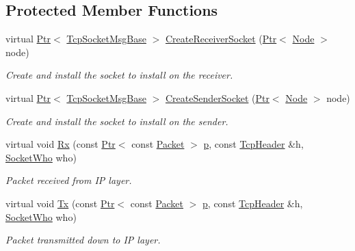 \subsection*{Protected Member Functions}
\begin{DoxyCompactItemize}
\item 
virtual \hyperlink{classns3_1_1Ptr}{Ptr}$<$ \hyperlink{classns3_1_1TcpSocketMsgBase}{Tcp\+Socket\+Msg\+Base} $>$ \hyperlink{classTcpRttEstimationTest_ad28cb87b3ee874008937ff5158980e3d}{Create\+Receiver\+Socket} (\hyperlink{classns3_1_1Ptr}{Ptr}$<$ \hyperlink{classns3_1_1Node}{Node} $>$ node)
\begin{DoxyCompactList}\small\item\em Create and install the socket to install on the receiver. \end{DoxyCompactList}\item 
virtual \hyperlink{classns3_1_1Ptr}{Ptr}$<$ \hyperlink{classns3_1_1TcpSocketMsgBase}{Tcp\+Socket\+Msg\+Base} $>$ \hyperlink{classTcpRttEstimationTest_a9b84db1757b8702294bc1310160adc44}{Create\+Sender\+Socket} (\hyperlink{classns3_1_1Ptr}{Ptr}$<$ \hyperlink{classns3_1_1Node}{Node} $>$ node)
\begin{DoxyCompactList}\small\item\em Create and install the socket to install on the sender. \end{DoxyCompactList}\item 
virtual void \hyperlink{classTcpRttEstimationTest_ae9ca082b1475694ea29c540497bd7846}{Rx} (const \hyperlink{classns3_1_1Ptr}{Ptr}$<$ const \hyperlink{classns3_1_1Packet}{Packet} $>$ \hyperlink{lte__link__budget__x2__handover__measures_8m_ac9de518908a968428863f829398a4e62}{p}, const \hyperlink{classns3_1_1TcpHeader}{Tcp\+Header} \&h, \hyperlink{classns3_1_1TcpGeneralTest_a29338e6b7137cad650c2ff835713f6ee}{Socket\+Who} who)
\begin{DoxyCompactList}\small\item\em Packet received from IP layer. \end{DoxyCompactList}\item 
virtual void \hyperlink{classTcpRttEstimationTest_ab5ad5c4ad8bb1fc46cc6eedd9a36bca5}{Tx} (const \hyperlink{classns3_1_1Ptr}{Ptr}$<$ const \hyperlink{classns3_1_1Packet}{Packet} $>$ \hyperlink{lte__link__budget__x2__handover__measures_8m_ac9de518908a968428863f829398a4e62}{p}, const \hyperlink{classns3_1_1TcpHeader}{Tcp\+Header} \&h, \hyperlink{classns3_1_1TcpGeneralTest_a29338e6b7137cad650c2ff835713f6ee}{Socket\+Who} who)
\begin{DoxyCompactList}\small\item\em Packet transmitted down to IP layer. \end{DoxyCompactList}\item 

\end{DoxyCompactItemize}
